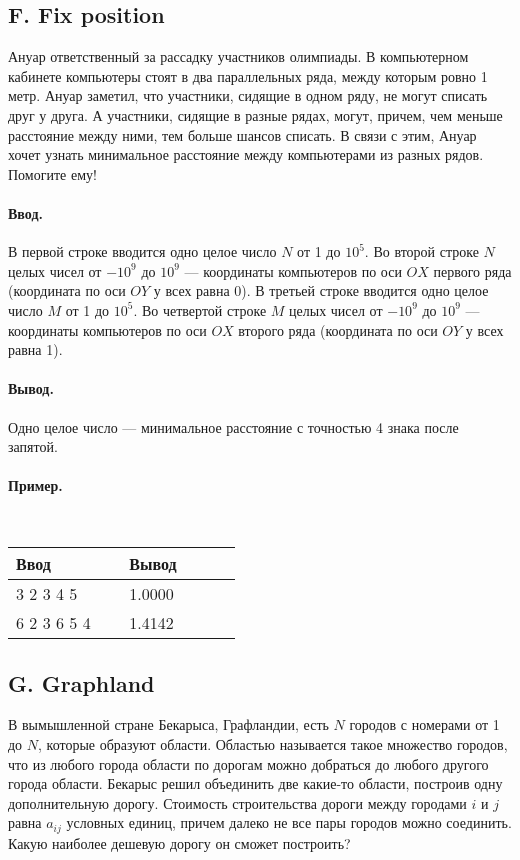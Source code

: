 \documentclass[12pt, a4paper]{article}
\newcommand{\informat}[1]
{
	\paragraph{Ввод.\\} #1
}
\newcommand{\outformat}[1]
{
	\paragraph{Вывод.\\} #1
}
\newcommand{\examplee}[4]
{
	\paragraph{Пример.\\}
	{\tt
	\begin{tabular}{|p{0.4\linewidth}|p{0.4\linewidth}|}
	\hline
	Ввод 	& Вывод  	\\
	\hline
	#1 		& #2 		\\
	\hline
	#3		& #4		\\
	\hline
	\end{tabular}
	}
}
\begin{document}
\subsection*{F. Fix position}


Ануар ответственный за рассадку участников олимпиады. В компьютерном кабинете компьютеры стоят в два параллельных ряда, между которым ровно 1 метр. Ануар заметил, что участники, сидящие в одном ряду, не могут списать друг у друга. А участники, сидящие в разные рядах, могут, причем, чем меньше расстояние между ними, тем больше шансов списать. В связи с этим, Ануар хочет узнать минимальное расстояние между компьютерами из разных рядов. Помогите ему!

\informat{В первой строке вводится одно целое число $N$ от 1 до $10^5$. \newline 
Во второй строке $N$ целых чисел от $-10^9$ до $10^9$ --- координаты компьютеров по оси $OX$ первого ряда (координата по оси $OY$ у всех равна 0). \newline
В третьей строке вводится одно целое число $M$ от 1 до $10^5$. \newline
Во четвертой строке $M$ целых чисел от $-10^9$ до $10^9$ --- координаты компьютеров по оси $OX$ второго ряда (координата по оси $OY$ у всех равна 1).}

\outformat{Одно целое число --- минимальное расстояние с точностью 4 знака после запятой.}

\examplee
{3 \newline
1 2 3 \newline
3 \newline
3 4 5}
{1.0000}
{6 \newline
1 2 3 6 5 4 \newline
1 \newline
0}
{1.4142}



\subsection*{G. Graphland}


В вымышленной стране Бекарыса, Графландии, есть $N$ городов с номерами от 1 до $N$, которые образуют области. Областью называется такое множество городов, что из любого города области по дорогам можно добраться до любого другого города области. Бекарыс решил объединить две какие-то области, построив одну дополнительную дорогу. Стоимость строительства дороги между городами $i$ и $j$ равна $a_{ij}$ условных единиц, причем далеко не все пары городов можно соединить. Какую наиболее дешевую дорогу он сможет построить?
\end{document}
